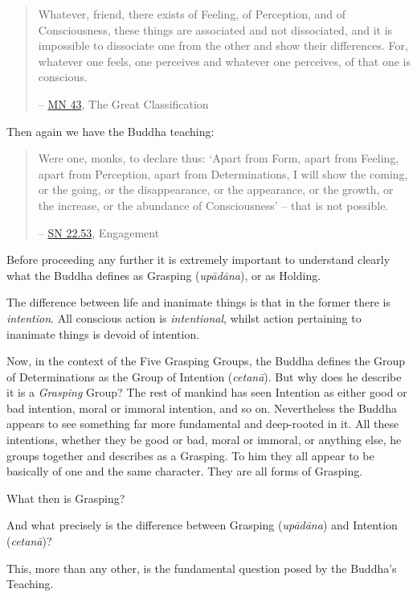 \begin{quote}
Whatever, friend, there exists of Feeling, of Perception, and of Consciousness, these things are associated and not dissociated, and it is impossible to dissociate one from the other and show their differences. For, whatever one feels, one perceives and whatever one perceives, of that one is conscious.

 -- \href{https://suttacentral.net/mn43/en/sujato}{MN 43}, The Great Classification
\end{quote}

Then again we have the Buddha teaching:

\begin{quote}
Were one, monks, to declare thus: `Apart from Form, apart from Feeling, apart from Perception, apart from Determinations, I will show the coming, or the going, or the disappearance, or the appearance, or the growth, or the increase, or the abundance of Consciousness' -- that is not possible.

 -- \href{https://suttacentral.net/sn22.53/en/bodhi}{SN 22.53}, Engagement
\end{quote}

Before proceeding any further it is extremely important to understand clearly what the Buddha defines as Grasping (\textit{upādāna}), or as Holding.

The difference between life and inanimate things is that in the former there is \emph{intention}. All conscious action is \emph{intentional}, whilst action pertaining to inanimate things is devoid of intention.

Now, in the context of the Five Grasping Groups, the Buddha defines the Group of Determinations as the Group of Intention (\textit{cetanā}). But why does he describe it is a \emph{Grasping} Group? The rest of mankind has seen Intention as either good or bad intention, moral or immoral intention, and so on. Nevertheless the Buddha appears to see something far more fundamental and deep-rooted in it. All these intentions, whether they be good or bad, moral or immoral, or anything else, he groups together and describes as a Grasping. To him they all appear to be basically of one and the same character. They are all forms of Grasping.

What then is Grasping?

And what precisely is the difference between Grasping (\textit{upādāna}) and Intention (\textit{cetanā})?

This, more than any other, is the fundamental question posed by the Buddha's Teaching.

